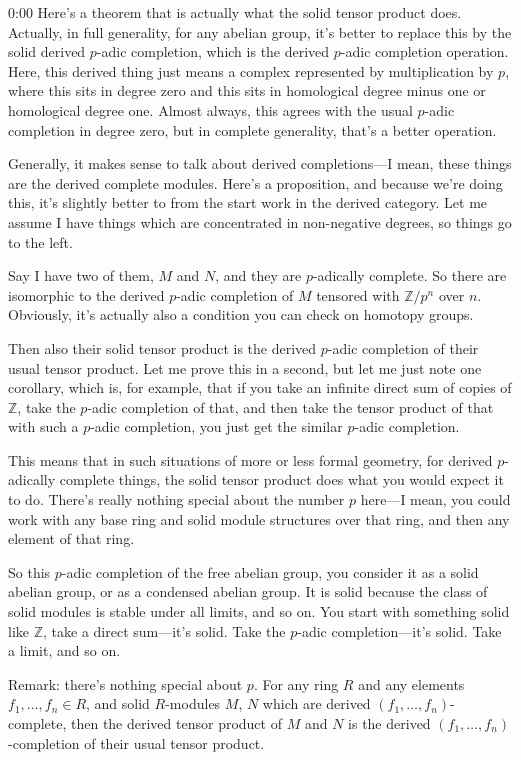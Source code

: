 \begin{unfinished}{0:00}
Here's a theorem that is actually what the solid tensor product does. Actually, in full generality, for any abelian group, it's better to replace this by the solid derived $p$-adic completion, which is the derived $p$-adic completion operation. Here, this derived thing just means a complex represented by multiplication by $p$, where this sits in degree zero and this sits in homological degree minus one or homological degree one. Almost always, this agrees with the usual $p$-adic completion in degree zero, but in complete generality, that's a better operation.

Generally, it makes sense to talk about derived completions---I mean, these things are the derived complete modules. Here's a proposition, and because we're doing this, it's slightly better to from the start work in the derived category. Let me assume I have things which are concentrated in non-negative degrees, so things go to the left.

Say I have two of them, $M$ and $N$, and they are $p$-adically complete. So there are isomorphic to the derived $p$-adic completion of $M$ tensored with $\mathbb{Z}/p^n$ over $n$. Obviously, it's actually also a condition you can check on homotopy groups.

Then also their solid tensor product is the derived $p$-adic completion of their usual tensor product. Let me prove this in a second, but let me just note one corollary, which is, for example, that if you take an infinite direct sum of copies of $\mathbb{Z}$, take the $p$-adic completion of that, and then take the tensor product of that with such a $p$-adic completion, you just get the similar $p$-adic completion.

This means that in such situations of more or less formal geometry, for derived $p$-adically complete things, the solid tensor product does what you would expect it to do. There's really nothing special about the number $p$ here---I mean, you could work with any base ring and solid module structures over that ring, and then any element of that ring.

So this $p$-adic completion of the free abelian group, you consider it as a solid abelian group, or as a condensed abelian group. It is solid because the class of solid modules is stable under all limits, and so on. You start with something solid like $\mathbb{Z}$, take a direct sum---it's solid. Take the $p$-adic completion---it's solid. Take a limit, and so on.

Remark: there's nothing special about $p$. For any ring $R$ and any elements $f_1, \ldots, f_n \in R$, and solid $R$-modules $M$, $N$ which are derived $(f_1, \ldots, f_n)$-complete, then the derived tensor product of $M$ and $N$ is the derived $(f_1, \ldots, f_n)$-completion of their usual tensor product.


\end{unfinished}
